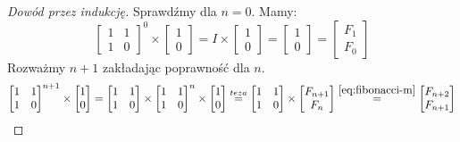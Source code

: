 \begin{proof}[Dowód przez indukcję]
  Sprawdźmy dla $n = 0$. Mamy:
  \begin{equation*}
    \begin{bmatrix}1 & 1 \\ 1 & 0\end{bmatrix}^0
    \times
    \begin{bmatrix}1 \\ 0\end{bmatrix}
    =
    I
    \times
    \begin{bmatrix}1 \\ 0\end{bmatrix}
    =
    \begin{bmatrix}1 \\ 0\end{bmatrix}
    =
    \begin{bmatrix}F_1 \\ F_0\end{bmatrix}
  \end{equation*}
  Rozważmy $n + 1$ zakładając poprawność dla $n$.
  \begin{equation*}
    \begin{bmatrix}
      1 & 1 \\
      1 & 0
    \end{bmatrix}^{n + 1}
    \times
    \begin{bmatrix}1 \\ 0\end{bmatrix}
    =
    \begin{bmatrix}
      1 & 1 \\
      1 & 0
    \end{bmatrix}
    \times
    \begin{bmatrix}
      1 & 1 \\
      1 & 0
    \end{bmatrix}^{n}
    \times
    \begin{bmatrix}1 \\ 0\end{bmatrix}
    \stackrel{teza}{=}
    \begin{bmatrix}
      1 & 1 \\
      1 & 0
    \end{bmatrix}
    \times
    \begin{bmatrix}F_{n+1} \\ F_{n}\end{bmatrix}
    \stackrel{\ref{eq:fibonacci-m}}{=}
    \begin{bmatrix}F_{n + 2} \\ F_{n + 1}\end{bmatrix}
  \end{equation*}
\end{proof}

